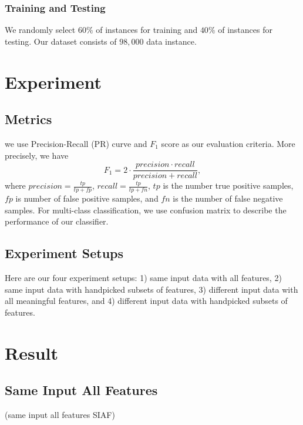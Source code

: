 \documentclass{sig-alternate}
\begin{document}
\subsubsection{Training and Testing}
We randomly select $60\%$ of instances for training and $40\%$ of instances for testing. Our dataset consists of $98,000$ data instance.

\section{Experiment}

\subsection{Metrics}
we use Precision-Recall (PR) curve and $F_1$ score as our evaluation criteria. More precisely, we have
\begin{equation}
F_{1} = 2\cdot\frac{precision \cdot recall}{precision + recall},
\end{equation}
where $precision = \frac{tp}{tp+fp}$, $recall = \frac{tp}{tp+fn}$, $tp$ is the number true positive samples, $fp$ is number of false positive samples, and $fn$ is the number of false negative samples. For multi-class classification, we use confusion matrix to describe the performance of our classifier.

\subsection{Experiment Setups}
Here are our four experiment setups: 1) same input data with all features, 2) same input data with handpicked subsets of features, 3) different input data with all meaningful features, and 4) different input data with handpicked subsets of features.

\section{Result}
\subsection{Same Input All Features}
(same input all features SIAF)
\end{document}
